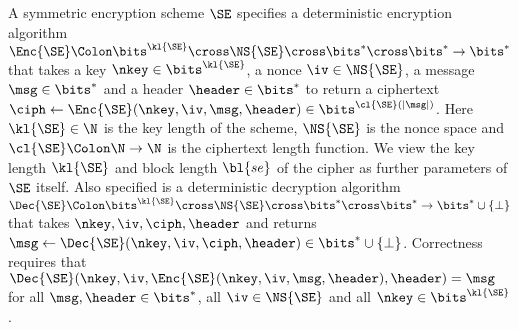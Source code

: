 
A symmetric encryption scheme $\SE$ specifies a 
deterministic encryption algorithm $\Enc{\SE}  \allowbreak  \Colon  \allowbreak  \bits^{\kl{\SE}}  \allowbreak \cross \allowbreak   \NS{\SE}  \allowbreak  \cross  \allowbreak  \bits^*  \allowbreak \cross \bits^* \to \bits^*$ that takes a key $\nkey \in \bits^{\kl{\SE}}$, a nonce $\iv \in \NS{\SE}$, a message $\msg\in\bits^*$ and a header $\header\in\bits^*$ to return a ciphertext 
$
  \ciph \gets \allowbreak \Enc{\SE}(\nkey,\allowbreak \iv,\allowbreak \msg,\header) \allowbreak \in \allowbreak \bits^{\cl{\SE}(|\msg|)}
$.
Here $\kl{\SE}\in\N$ is the key length of the scheme, $\NS{\SE}$ is the nonce space and $\cl{\SE}\Colon\N\to\N$ is the ciphertext length function.  We view the key length $\kl{\SE}$ and block length $\bl{se}$ of the cipher as further parameters of $\SE$ itself. Also specified is a deterministic decryption algorithm $\Dec{\SE} \Colon \bits^{\kl{\SE}}\cross \NS{\SE} \cross \bits^* \cross \bits^* \to \bits^*\cup\{\bot\}$  that takes $\nkey,\iv,\ciph,\header$ and returns $\msg \gets \Dec{\SE}(\nkey,\iv,\ciph,\header) \in \bits^*\cup\{\bot\}$. Correctness requires that $\Dec{\SE}(\nkey,\iv,\Enc{\SE}(\nkey,\iv,\msg,\header),\header) = \msg$ for all $\msg,\header \in \bits^*$, all $\iv\in\NS{\SE}$ and all $\nkey \in\bits^{\kl{\SE}}$.

